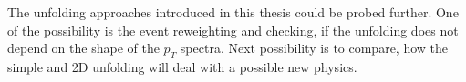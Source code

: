 \documentclass[a4paper,11pt,twoside,openright]{book}
\newcommand{\MyQuote}[2]{
  \begin{flushleft}
    \textit{\quotation{#1}}
  \end{flushleft}
  \begin{flushright}
    #2
  \end{flushright}
  \vspace{10mm}
}
\newcommand{\pt}{p_{T}}
\begin{document}
The unfolding approaches introduced in this thesis could be probed further. One
of the possibility is the event reweighting and checking, if the unfolding does
not depend on the shape of the $\pt$ spectra. Next possibility is to compare,
how the simple and 2D unfolding will deal with a possible new physics.






\clearpage
{}



\cleardoublepage

%
%
%
%
%
%
%
\end{document}
